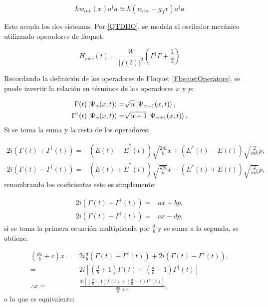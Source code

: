 \documentclass[a4paper,10pt]{report}
\begin{document}
\begin{equation}
\hbar w_{cav}(x) a^\dagger a \simeq \hbar(w_{cav}-g_0x)a^\dagger a
\end{equation}

Esto acopla los dos sistemas. Por \ref{QTDHO}, se modela al oscilador mecánico utilizando operadores de floquet:

\begin{equation}
H_{mec}(t) = \frac{W}{|f(t)|^2}(\Gamma^\dagger \Gamma + \frac{1}{2})
\end{equation}

Recordando la definición de los operadores de Floquet \ref{FloquetOperators}, se puede invertir la relación en términos de los operadores $x$ y $p$:


\begin{align*}
\Gamma(t) \Ket{\Psi_\alpha (x,t)} =& \sqrt{\alpha}\Ket{\Psi_{\alpha-1} (x,t)}, \\
\Gamma^\dagger(t) \Ket{\Psi_\alpha (x,t)} =& \sqrt{\alpha+1}\Ket{\Psi_{\alpha+1} (x,t)}.
\end{align*}Si se toma la suma y la resta de los operadores:

\begin{align*}
2i(\Gamma (t) + \Gamma ^\dagger (t)) =& (\dot{E} (t) - \dot{E}^* (t)) \sqrt{\frac{2m}{\hbar}}x + (E^* (t) - E (t))\sqrt{\frac{2}{m\hbar}} p, \\
2i(\Gamma (t) - \Gamma ^\dagger (t)) =& (\dot{E} (t) + \dot{E}^* (t)) \sqrt{\frac{2m}{\hbar}}x -(E^* (t) + E (t))\sqrt{\frac{2}{m\hbar}} p,
\end{align*} renombrando los coeficientes esto es simplemente:

\begin{align*}
2i(\Gamma (t) + \Gamma ^\dagger (t)) =& ax + bp, \\
2i(\Gamma (t) - \Gamma ^\dagger (t)) =& cx - dp,
\end{align*} si se toma la primera ecuación multiplicada por $\frac{d}{b}$ y se suma a la segunda, se obtiene:

\begin{align*}
(\frac{da}{b}+c)x =& 2i \frac{d}{b}(\Gamma (t) + \Gamma ^\dagger (t)) + 2i(\Gamma (t) - \Gamma ^\dagger (t)), \\
=&2i[(\frac{d}{b}+1)\Gamma (t)+(\frac{d}{b}-1)\Gamma^\dagger (t)]\\
\therefore x =& \frac{2i[(\frac{d}{b}+1)\Gamma (t)+(\frac{d}{b}-1)\Gamma^\dagger (t)]}{\frac{da}{b}+c},
\end{align*} o lo que es equivalente:
\end{document}
